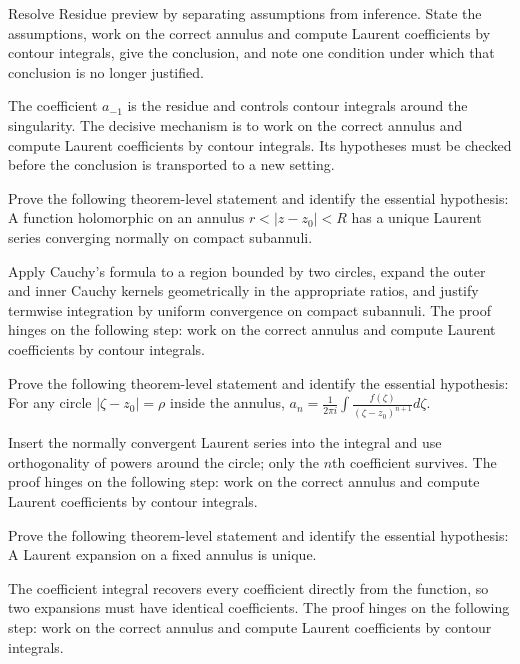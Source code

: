 \begin{problem}\label{prob:iv08-problem-08}
Resolve Residue preview by separating assumptions from inference. State the assumptions, work on the correct annulus and compute Laurent coefficients by contour integrals, give the conclusion, and note one condition under which that conclusion is no longer justified.
\end{problem}
\begin{solution}
The coefficient $a_{-1}$ is the residue and controls contour integrals around the singularity. The decisive mechanism is to work on the correct annulus and compute Laurent coefficients by contour integrals. Its hypotheses must be checked before the conclusion is transported to a new setting.
\end{solution}

\begin{problem}\label{prob:iv08-problem-09}
Prove the following theorem-level statement and identify the essential hypothesis: A function holomorphic on an annulus $r<|z-z_0|<R$ has a unique Laurent series converging normally on compact subannuli.
\end{problem}
\begin{solution}
Apply Cauchy's formula to a region bounded by two circles, expand the outer and inner Cauchy kernels geometrically in the appropriate ratios, and justify termwise integration by uniform convergence on compact subannuli. The proof hinges on the following step: work on the correct annulus and compute Laurent coefficients by contour integrals.
\end{solution}

\begin{problem}\label{prob:iv08-problem-10}
Prove the following theorem-level statement and identify the essential hypothesis: For any circle $|\zeta-z_0|=\rho$ inside the annulus, $a_n=\frac1{2\pi i}\int\frac{f(\zeta)}{(\zeta-z_0)^{n+1}}d\zeta$.
\end{problem}
\begin{solution}
Insert the normally convergent Laurent series into the integral and use orthogonality of powers around the circle; only the $n$th coefficient survives. The proof hinges on the following step: work on the correct annulus and compute Laurent coefficients by contour integrals.
\end{solution}

\begin{problem}[Uniqueness]\label{prob:iv08-problem-11}
Prove the following theorem-level statement and identify the essential hypothesis: A Laurent expansion on a fixed annulus is unique.
\end{problem}
\begin{solution}
The coefficient integral recovers every coefficient directly from the function, so two expansions must have identical coefficients. The proof hinges on the following step: work on the correct annulus and compute Laurent coefficients by contour integrals.
\end{solution}

